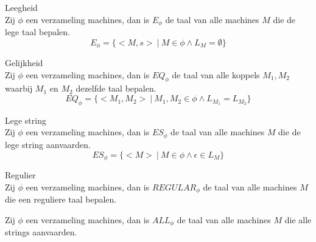 \documentclass[main.tex]{subfiles}
\begin{document}
\begin{de}
  Leegheid\\
  Zij $\phi$ een verzameling machines, dan is $E_{\phi}$ de taal van alle machines $M$ die de lege taal bepalen.
  \[ E_{\phi} = \{ <M,s>\ |\ M \in \phi \wedge L_{M} = \emptyset \} \]
\end{de}

\begin{de}
  Gelijkheid\\
  Zij $\phi$ een verzameling machines, dan is $EQ_{\phi}$ de taal van alle koppels $M_{1},M_{2}$ waarbij $M_{1}$ en $M_{2}$ dezelfde taal bepalen.
  \[ EQ_{\phi} = \{ <M_{1},M_{2}> \ |\ M_{1},M_{2} \in \phi \wedge L_{M_{1}} = L_{M_{2}} \} \]
\end{de}

\begin{de}
  Lege string\\
  Zij $\phi$ een verzameling machines, dan is $ES_{\phi}$ de taal van alle machines $M$ die de lege string aanvaarden.
  \[ ES_{\phi} = \{ <M> \ |\ M\in \phi \wedge \epsilon \in L_{M}\} \]
\end{de}

\begin{de}
  Regulier\\
  Zij $\phi$ een verzameling machines, dan is $REGULAR_{\phi}$ de taal van alle machines $M$ die een reguliere taal bepalen.
\end{de}

\begin{de}
  Zij $\phi$ een verzameling machines, dan is $ALL_{\phi}$ de taal van alle machines $M$ die alle strings aanvaarden.
\end{de}
\end{document}
